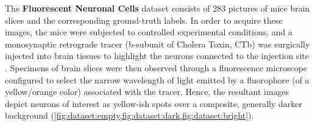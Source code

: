 

The \textbf{Fluorescent Neuronal Cells} dataset \cite{clissa2021fluocells} consists of 283 
pictures 
of mice brain slices and the corresponding ground-truth labels.
In order to acquire these images, the mice were subjected to controlled experimental conditions, and a monosynaptic retrograde tracer (b-subunit of Cholera Toxin, CTb) was surgically injected into brain tissues to highlight the neurons connected to the injection site
\cite{hitrec2019neural}.
Specimens of brain slices were then observed through  
a fluorescence microscope configured to select the narrow wavelength of light emitted by a fluorophore (of a yellow/orange color) associated with the tracer.
Hence, the resultant images depict neurons of interest as
yellow-ish spots
over a composite, generally darker background
(\cref{fig:dataset:empty,fig:dataset:dark,fig:dataset:bright}).

